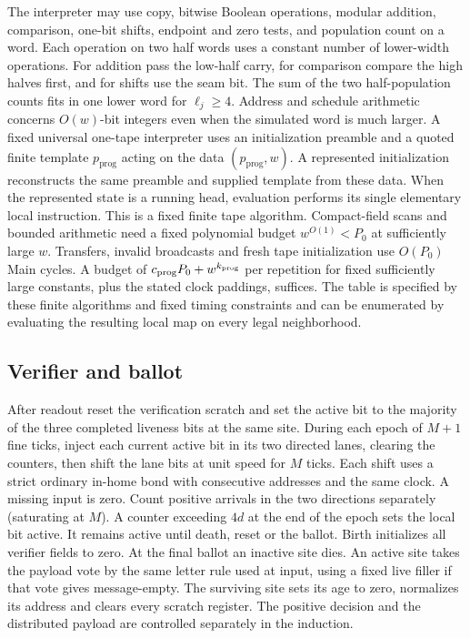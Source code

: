 The interpreter may use copy, bitwise Boolean operations, modular addition, comparison, one-bit shifts, endpoint and zero tests, and population count on a word. Each operation on two half words uses a constant number of lower-width operations. For addition pass the low-half carry, for comparison compare the high halves first, and for shifts use the seam bit. The sum of the two half-population counts fits in one lower word for \(\ell_j\ge4\). Address and schedule arithmetic concerns \(O(w)\)-bit integers even when the simulated word is much larger. A fixed universal one-tape interpreter uses an initialization preamble and a quoted finite template \(p_{\mathrm{prog}}\) acting on the data \((p_{\mathrm{prog}},w)\). A represented initialization reconstructs the same preamble and supplied template from these data. When the represented state is a running head, evaluation performs its single elementary local instruction. This is a fixed finite tape algorithm. Compact-field scans and bounded arithmetic need a fixed polynomial budget \(w^{O(1)}<P_0\) at sufficiently large \(w\). Transfers, invalid broadcasts and fresh tape initialization use \(O(P_0)\) Main cycles. A budget of \(c_{\rm prog}P_0+w^{k_{\rm prog}}\) per repetition for fixed sufficiently large constants, plus the stated clock paddings, suffices. The table is specified by these finite algorithms and fixed timing constraints and can be enumerated by evaluating the resulting local map on every legal neighborhood.

\subsection{Verifier and ballot}\label{sec:verifier}

After readout reset the verification scratch and set the active bit to the majority of the three completed liveness bits at the same site. During each epoch of \(M+1\) fine ticks, inject each current active bit in its two directed lanes, clearing the counters, then shift the lane bits at unit speed for \(M\) ticks. Each shift uses a strict ordinary in-home bond with consecutive addresses and the same clock. A missing input is zero. Count positive arrivals in the two directions separately (saturating at \(M\)). A counter exceeding \(4d\) at the end of the epoch sets the local bit active. It remains active until death, reset or the ballot. Birth initializes all verifier fields to zero. At the final ballot an inactive site dies. An active site takes the payload vote by the same letter rule used at input, using a fixed live filler if that vote gives message-empty. The surviving site sets its age to zero, normalizes its address and clears every scratch register. The positive decision and the distributed payload are controlled separately in the induction.

